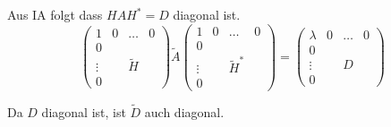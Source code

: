 \documentclass[11pt]{article}
\theoremstyle{plain}
\theoremstyle{definition}
\begin{document}
\begin{itemize}
Aus IA folgt dass $HAH^*=D$ diagonal ist.
\begin{equation}
\left(
\begin{array}{c|ccc}
1 & 0 & \hdots & 0    \\\hline
0  & & &                    \\
\vdots & & \tilde{H} &        \\
0  & & &
\end{array}
\right)
\tilde{A}
\left(
\begin{array}{c|ccc}
1 & 0 & \hdots & 0    \\\hline
0  & & &                    \\
\vdots & & \tilde{H}^* &        \\
0  & & &
\end{array}
\right)
=
\left(
\begin{array}{c|ccc}
\lambda & 0 & \hdots & 0    \\\hline
0  & & &                    \\
\vdots & & D &        \\
0  & & &
\end{array}
\right)
\end{equation}

Da $D$ diagonal ist, ist $\tilde{D}$ auch diagonal.


\end{itemize}
\end{document}
